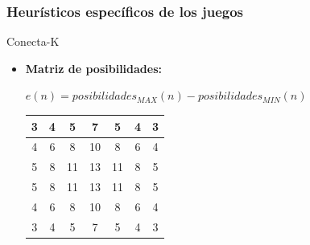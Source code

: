 \documentclass[10pt]{beamer}
\begin{document}
\begin{frame}[t]
\frametitle{Heurísticos específicos de los juegos}

\begin{block}{Conecta-K}
\begin{itemize}
\item \textbf{Matriz de posibilidades:}
\begin{center}
$e(n) = posibilidades_{MAX}(n)− posibilidades_{MIN}(n)$
\end{center}
\begin{center}
{\footnotesize
\begin{tabular}{|c|c|c|c|c|c|c|}
\hline
3& 4& 5& 7& 5& 4& 3\\ 
\hline
4& 6& 8& 10& 8& 6& 4\\ 
\hline
5& 8& 11& 13& 11& 8& 5\\ 
\hline
5& 8& 11& 13& 11& 8& 5\\ 
\hline
4& 6& 8& 10& 8& 6& 4 \\
\hline
3& 4& 5& 7& 5& 4& 3 \\
\hline
\end{tabular}
}
\end{center}


\end{itemize}
\end{block}
\end{frame}
\end{document}
